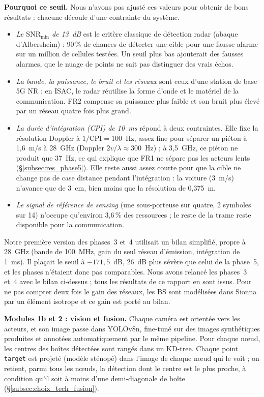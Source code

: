 \documentclass[12pt,a4paper,titlepage]{article}
\begin{document}
\textbf{Pourquoi ce seuil.} Nous n'avons pas ajusté ces valeurs pour obtenir de bons résultats : chacune découle d'une contrainte du système.
\begin{itemize}[leftmargin=1.5em]
    \item \emph{Le $\mathrm{SNR}_{\min}$ de 13~dB} est le critère classique de détection radar (abaque d'Albersheim) : 90\,\% de chances de détecter une cible pour une fausse alarme sur un million de cellules testées. Un seuil plus bas ajouterait des fausses alarmes, que le nuage de points ne sait pas distinguer des vrais échos.
    \item \emph{La bande, la puissance, le bruit et les réseaux} sont ceux d'une station de base 5G NR : en ISAC, le radar réutilise la forme d'onde et le matériel de la communication. FR2 compense sa puissance plus faible et son bruit plus élevé par un réseau quatre fois plus grand.
    \item \emph{La durée d'intégration (CPI) de 10~ms} répond à deux contraintes. Elle fixe la résolution Doppler à $1/\mathrm{CPI} = 100$~Hz, assez fine pour séparer un piéton à 1,6~m/s à 28~GHz (Doppler $2v/\lambda \approx 300$~Hz) ; à 3,5~GHz, ce piéton ne produit que 37~Hz, ce qui explique que FR1 ne sépare pas les acteurs lents (\S\ref{subsec:res_phase5}). Elle reste aussi assez courte pour que la cible ne change pas de case distance pendant l'intégration : la voiture (3~m/s) n'avance que de 3~cm, bien moins que la résolution de 0,375~m.
    \item \emph{Le signal de référence de sensing} (une sous-porteuse sur quatre, 2 symboles sur 14) n'occupe qu'environ 3,6\,\% des ressources ; le reste de la trame reste disponible pour la communication.
\end{itemize}
Notre première version des phases~3 et~4 utilisait un bilan simplifié, propre à 28~GHz (bande de 100~MHz, gain du seul réseau d'émission, intégration de 1~ms). Il plaçait le seuil à $-171{,}5$~dB, 26~dB plus sévère que celui de la phase~5, et les phases n'étaient donc pas comparables. Nous avons relancé les phases~3 et~4 avec le bilan ci-dessus ; tous les résultats de ce rapport en sont issus. Pour ne pas compter deux fois le gain des réseaux, les BS sont modélisées dans Sionna par un élément isotrope et ce gain est porté au bilan.

\textbf{Modules 1b et 2 : vision et fusion.} Chaque caméra est orientée vers les acteurs, et son image passe dans YOLOv8n, fine-tuné sur des images synthétiques produites et annotées automatiquement par le même pipeline. Pour chaque n\oe ud, les centres des boîtes détectées sont rangés dans un KD-tree. Chaque point \texttt{target} est projeté (modèle sténopé) dans l'image de chaque n\oe ud qui le voit ; on retient, parmi tous les n\oe uds, la détection dont le centre est le plus proche, à condition qu'il soit à moins d'une demi-diagonale de boîte (\S\ref{subsec:choix_tech_fusion}).
\end{document}
